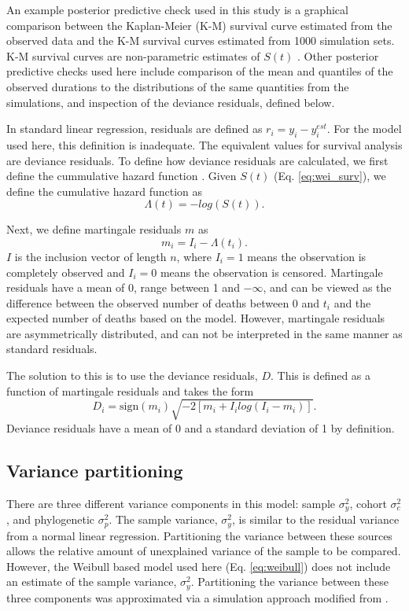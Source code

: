 \documentclass{article}
\begin{document}
An example posterior predictive check used in this study is a graphical comparison between the Kaplan-Meier (K-M) survival curve estimated from the observed data and the K-M survival curves estimated from 1000 simulation sets. K-M survival curves are non-parametric estimates of \(S(t)\) \cite{Klein2003}. Other posterior predictive checks used here include comparison of the mean and quantiles of the observed durations to the distributions of the same quantities from the simulations, and inspection of the deviance residuals, defined below.

In standard linear regression, residuals are defined as \(r_{i} = y_{i} - y_{i}^{est}\). For the model used here, this definition is inadequate. The equivalent values for survival analysis are deviance residuals. To define how deviance residuals are calculated, we first define the cummulative hazard function \cite{Klein2003}. Given \(S(t)\) (Eq. \ref{eq:wei_surv}), we define the cumulative hazard function as 
\begin{equation*}
  \Lambda(t) = -log\left(S\left(t\right)\right).
\end{equation*}

Next, we define martingale residuals \(m\) as
\begin{equation*}
  m_{i} = I_{i} - \Lambda(t_i).
\end{equation*}
\(I\) is the inclusion vector of length \(n\), where \(I_{i} = 1\) means the observation is completely observed and \(I_{i} = 0\) means the observation is censored. Martingale residuals have a mean of 0, range between 1 and \(-\infty\), and can be viewed as the difference between the observed number of deaths between 0 and \(t_{i}\) and the expected number of deaths based on the model. However, martingale residuals are asymmetrically distributed, and can not be interpreted in the same manner as standard residuals. 

The solution to this is to use the deviance residuals, \(D\). This is defined as a function of martingale residuals and takes the form
\begin{equation*}
  D_{i} = \text{sign}(m_{i}) \sqrt{-2[m_{i} + I_{i}log(I_{i} - m_{i})]}.
\end{equation*}
Deviance residuals have a mean of 0 and a standard deviation of 1 by definition.


\subsection{Variance partitioning}
There are three different variance components in this model: sample \(\sigma_{y}^{2}\), cohort \(\sigma_{c}^{2}\), and phylogenetic \(\sigma_{p}^{2}\). The sample variance, \(\sigma_{y}^{2}\), is similar to the residual variance from a normal linear regression. Partitioning the variance between these sources allows the relative amount of unexplained variance of the sample to be compared. However, the Weibull based model used here (Eq. \ref{eq:weibull}) does not include an estimate of the sample variance, \(\sigma_{y}^{2}\). Partitioning the variance between these three components was approximated via a simulation approach modified from \cite{Goldstein2002}.
\end{document}
